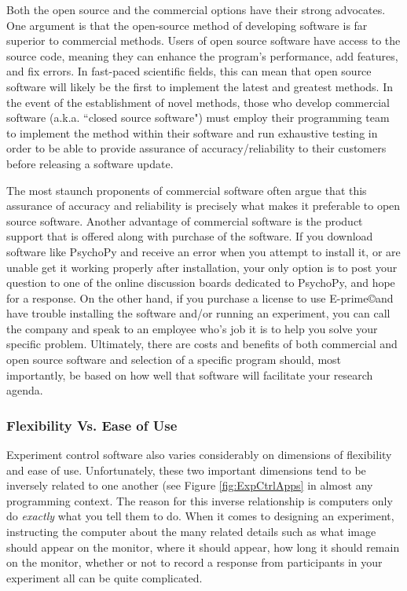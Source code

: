 Both the open source and the commercial options have their strong advocates. One argument is that the open-source method of developing software is far superior to commercial methods. Users of open source software have access to the source code, meaning they can enhance the program’s performance, add features, and fix errors. In fast-paced scientific fields, this can mean that open source software will likely be the first to implement the latest and greatest methods. In the event of the establishment of novel methods, those who develop commercial software (a.k.a. ``closed source software") must employ their programming team to implement the method within their software and run exhaustive testing in order to be able to provide assurance of accuracy/reliability to their customers before releasing a software update. 

The most staunch proponents of commercial software often argue that this assurance of accuracy and reliability is precisely what makes it preferable to open source software.  Another advantage of commercial software is the product support that is offered along with purchase of the software.  If you download software like PsychoPy and receive an error when you attempt to install it, or are unable get it working properly after installation, your only option is to post your question to one of the online discussion boards dedicated to PsychoPy, and hope for a response.  On the other hand, if you purchase a license to use E-prime\copyright and have trouble installing the software and/or running an experiment, you can call the company and speak to an employee who's job it is to help you solve your specific problem. Ultimately, there are costs and benefits of both commercial and open source software and selection of a specific program should, most importantly, be based on how well that software will facilitate your research agenda.

\subsubsection{Flexibility Vs. Ease of Use}
Experiment control software also varies considerably on dimensions of flexibility and ease of use. Unfortunately, these two important dimensions tend to be inversely related to one another (see Figure \ref{fig:ExpCtrlApps} in almost any programming context. The reason for this inverse relationship is computers only do \emph{exactly} what you tell them to do.  When it comes to designing an experiment, instructing the computer about the many related details such as what image should appear on the monitor, where it should appear, how long it should remain on the monitor, whether or not to record a response from participants in your experiment all can be quite complicated. 

